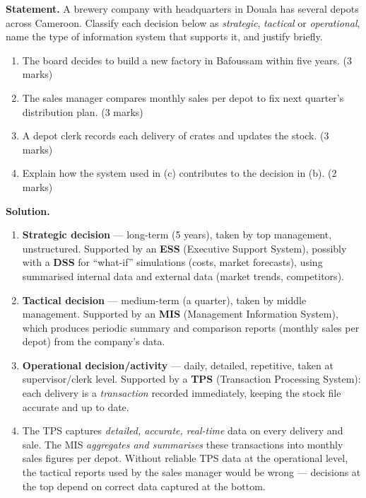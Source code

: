 \documentclass[11pt]{article}
\begin{document}
\begin{exoresolu}
\textbf{Statement.} A brewery company with headquarters in Douala has several depots across Cameroon. Classify each decision below as \emph{strategic}, \emph{tactical} or \emph{operational}, name the type of information system that supports it, and justify briefly.
\begin{enumerate}
\item[a)] The board decides to build a new factory in Bafoussam within five years. \hfill (3 marks)
\item[b)] The sales manager compares monthly sales per depot to fix next quarter's distribution plan. \hfill (3 marks)
\item[c)] A depot clerk records each delivery of crates and updates the stock. \hfill (3 marks)
\item[d)] Explain how the system used in (c) contributes to the decision in (b). \hfill (2 marks)
\end{enumerate}
\tcblower
\textbf{Solution.}
\begin{enumerate}
\item[a)] \textbf{Strategic decision} — long-term (5 years), taken by top management, unstructured. Supported by an \textbf{ESS} (Executive Support System), possibly with a \textbf{DSS} for ``what-if'' simulations (costs, market forecasts), using summarised internal data and external data (market trends, competitors).
\item[b)] \textbf{Tactical decision} — medium-term (a quarter), taken by middle management. Supported by an \textbf{MIS} (Management Information System), which produces periodic summary and comparison reports (monthly sales per depot) from the company's data.
\item[c)] \textbf{Operational decision/activity} — daily, detailed, repetitive, taken at supervisor/clerk level. Supported by a \textbf{TPS} (Transaction Processing System): each delivery is a \emph{transaction} recorded immediately, keeping the stock file accurate and up to date.
\item[d)] The TPS captures \emph{detailed, accurate, real-time} data on every delivery and sale. The MIS \emph{aggregates and summarises} these transactions into monthly sales figures per depot. Without reliable TPS data at the operational level, the tactical reports used by the sales manager would be wrong — decisions at the top depend on correct data captured at the bottom.
\end{enumerate}
\end{exoresolu}
\end{document}

